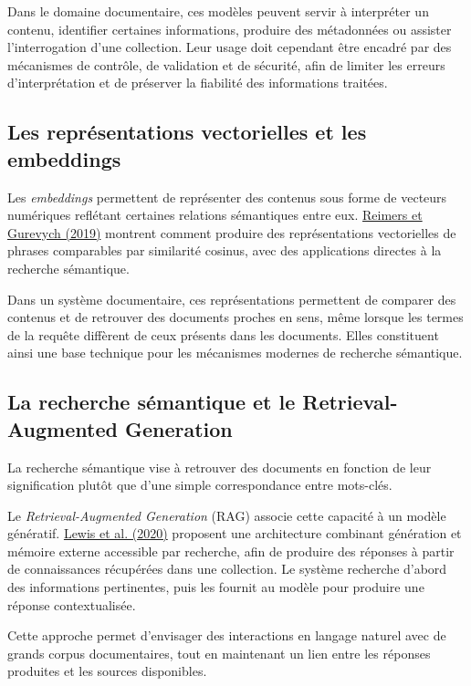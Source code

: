 \documentclass[12pt,a4paper]{report}
\newcommand{\citer}[2]{\hyperref[ref:#1]{#2}}
\begin{document}
Dans le domaine documentaire, ces modèles peuvent servir à interpréter un contenu, identifier certaines informations, produire des métadonnées ou assister l'interrogation d'une collection. Leur usage doit cependant être encadré par des mécanismes de contrôle, de validation et de sécurité, afin de limiter les erreurs d'interprétation et de préserver la fiabilité des informations traitées.

\subsection{Les représentations vectorielles et les embeddings}
Les \textit{embeddings} permettent de représenter des contenus sous forme de vecteurs numériques reflétant certaines relations sémantiques entre eux. \citer{reimers2019}{Reimers et Gurevych (2019)} montrent comment produire des représentations vectorielles de phrases comparables par similarité cosinus, avec des applications directes à la recherche sémantique.

Dans un système documentaire, ces représentations permettent de comparer des contenus et de retrouver des documents proches en sens, même lorsque les termes de la requête diffèrent de ceux présents dans les documents. Elles constituent ainsi une base technique pour les mécanismes modernes de recherche sémantique.

\subsection{La recherche sémantique et le Retrieval-Augmented Generation}
La recherche sémantique vise à retrouver des documents en fonction de leur signification plutôt que d'une simple correspondance entre mots-clés.

Le \textit{Retrieval-Augmented Generation} (RAG) associe cette capacité à un modèle génératif. \citer{lewis2020}{Lewis et al. (2020)} proposent une architecture combinant génération et mémoire externe accessible par recherche, afin de produire des réponses à partir de connaissances récupérées dans une collection. Le système recherche d'abord des informations pertinentes, puis les fournit au modèle pour produire une réponse contextualisée.

Cette approche permet d'envisager des interactions en langage naturel avec de grands corpus documentaires, tout en maintenant un lien entre les réponses produites et les sources disponibles.
\end{document}
